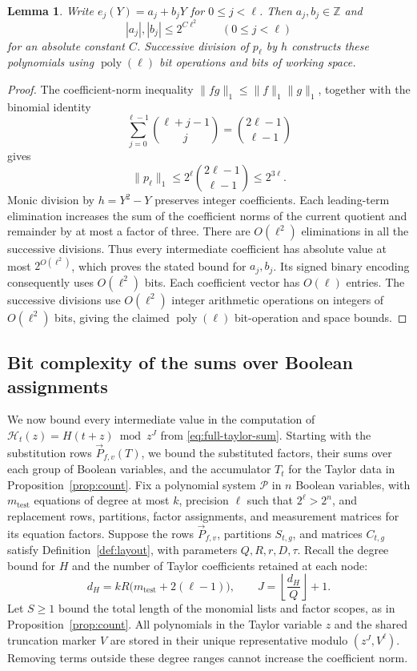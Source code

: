 \documentclass[11pt,reqno]{amsart}
\numberwithin{equation}{section}
\newtheorem{lemma}[theorem]{Lemma}
\theoremstyle{definition}\newtheorem{definition}[theorem]{Definition}
\theoremstyle{remark}\newtheorem{remark}[theorem]{Remark}
\newcommand{\poly}{\operatorname{poly}}
\renewcommand{\le}{\leqslant}
\renewcommand{\ge}{\geqslant}
\begin{document}
\begin{lemma}\label{lem:rational-lift-height}
Write $e_j(Y)=a_j+b_jY$ for $0\le j<\ell$. Then $a_j,b_j\in\mathbb Z$ and
\[
 |a_j|,|b_j|\le2^{C\ell^2}\qquad(0\le j<\ell)
\]
for an absolute constant $C$.
Successive division of $p_\ell$ by $h$ constructs these polynomials
using $\poly(\ell)$ bit operations and bits of working space.
\end{lemma}
\begin{proof}
The coefficient-norm inequality
$\|fg\|_1\le\|f\|_1\|g\|_1$, together with the binomial identity
\[
 \sum_{j=0}^{\ell-1}\binom{\ell+j-1}{j}
 =\binom{2\ell-1}{\ell-1}
\]
gives
\[
 \|p_\ell\|_1\le2^\ell\binom{2\ell-1}{\ell-1}\le2^{3\ell}.
\]
Monic division by $h=Y^2-Y$ preserves integer coefficients. Each
leading-term elimination increases the sum of the coefficient norms
of the current quotient and remainder by at most a factor of three.
There are $O(\ell^2)$ eliminations in all the successive divisions.
Thus every intermediate coefficient has absolute value at most
$2^{O(\ell^2)}$, which proves the stated bound for $a_j,b_j$.
Its signed binary encoding consequently uses $O(\ell^2)$ bits.
Each coefficient vector has $O(\ell)$
entries. The successive divisions use $O(\ell^2)$ integer arithmetic
operations on integers of $O(\ell^2)$ bits, giving the claimed
$\poly(\ell)$ bit-operation and space bounds.
\end{proof}

\subsection{Bit complexity of the sums over Boolean assignments}
\label{subsec:rational-streaming-height}
We now bound every intermediate value in the computation of
$\mathcal H_t(z)=H(t+z)\bmod z^J$ from \eqref{eq:full-taylor-sum}.
Starting with the substitution rows $\vec{P}_{f,v}(T)$, we bound the
substituted factors, their sums over each group of Boolean variables,
and the accumulator $T_t$ for the Taylor data in
Proposition~\ref{prop:count}.
Fix a polynomial system $\mathcal P$ in $n$ Boolean variables, with
$m_{\mathrm{test}}$ equations of degree at most $k$, precision
$\ell$ such that $2^\ell>2^n$, and replacement rows, partitions, factor assignments, and measurement matrices for its
equation factors. Suppose the rows $\vec{P}_{f,v}$,
partitions $S_{t,g}$, and matrices $C_{t,g}$ satisfy
Definition~\ref{def:layout}, with parameters $Q,R,r,D,\tau$.
Recall the degree bound for $H$ and the number of Taylor coefficients
retained at each node:
\[
 d_H=kR\bigl(m_{\mathrm{test}}+2(\ell-1)\bigr),\qquad
 J=\left\lfloor\frac{d_H}{Q}\right\rfloor+1.
\]
Let $S\ge1$ bound the total length of the monomial lists and factor
scopes, as in Proposition~\ref{prop:count}.
All polynomials in the Taylor variable $z$ and the shared truncation
marker $V$ are stored in their unique representative modulo
$(z^J,V^\ell)$. Removing terms outside these degree ranges cannot
increase the coefficient norm.
\end{document}
